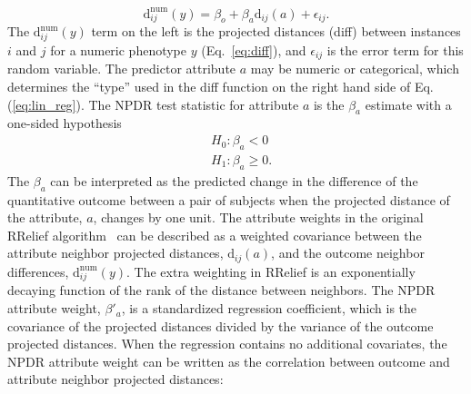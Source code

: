 \documentclass[10pt]{article}
\begin{document}

%
%
\begin{equation}\label{eq:lin_reg}
    \text{d}^{\text{num}}_{ij}(y) = \beta_{o} + \beta_{a} \text{d}_{ij}(a) + \epsilon_{ij}.
\end{equation}
The $\text{d}^{\text{num}}_{ij}(y)$ term on the left is the projected distances (diff) between instances $i$ and $j$ for a numeric phenotype $y$ (Eq.~\ref{eq:diff}), and $\epsilon_{ij}$ is the error term for this random variable. The predictor attribute $a$ may be numeric or categorical, which determines the ``type'' used in the diff function on the right hand side of Eq.(\ref{eq:lin_reg}). The NPDR test statistic for attribute $a$ is the $\beta_a$ estimate with a one-sided hypothesis
\begin{equation}\label{eq:linreg_null}
\begin{aligned}
    & H_0: \beta_a < 0 \\
    & H_1: \beta_a \ge 0.
\end{aligned}
\end{equation}
The $\beta_a$ can be interpreted as the predicted change in the difference of the quantitative outcome between a pair of subjects when the projected distance of the attribute, $a$, changes by one unit. The attribute weights in the original RRelief algorithm~\cite{robnik2003theoretical} can be described as a weighted covariance between the attribute neighbor projected distances, $\text{d}_{ij}(a)$, and the outcome neighbor differences, $\text{d}^{\text{num}}_{ij}(y)$. The extra weighting in RRelief is an exponentially decaying function of the rank of the distance between neighbors. The NPDR attribute weight, $\beta'_a$, is a standardized regression coefficient, which is the covariance of the projected distances divided by the variance of the outcome projected distances. When the regression contains no additional covariates, the NPDR attribute weight can be written as the correlation between outcome and attribute neighbor projected distances:
\end{document}
